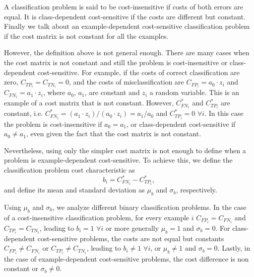   A classification problem is said to be cost-insensitive if costs of both errors are equal. It 
    is class-dependent cost-sensitive if the costs are different but constant. Finally we talk 
    about an example-dependent cost-sensitive classification problem if the cost matrix is not 
    constant for all the examples.
  
    However, the definition above is not general enough. There are many cases when the cost matrix 
    is not constant and still the problem is cost-insensitive or class-dependent cost-sensitive. 
    For example, if the costs of correct classification are zero, \mbox{$C_{TP_i}=C_{TN_i}=0$}, 
    and the costs of misclassification are $C_{FP_i}=a_0\cdot z_i$ and $C_{FN_i}=a_1\cdot z_i$,
    where $a_0$, $a_1$, are constant and $z_i$ a random variable. This is an example of a cost 
    matrix that is not constant. However, $C^*_{FN_i}$ and $C^*_{TP_i}$ are constant, i.e. 
    $C^*_{FN_i}=(a_1\cdot z_i)/(a_0\cdot z_i)=a_1/a_0$ and $C^*_{TP_i}=0$ $\forall i$. In 
    this case the problem is cost-insensitive if $a_0=a_1$, or class-dependent cost-sensitive if 
    $a_0 \ne a_1$, even given the fact that the cost matrix is not constant.
  
    Nevertheless, using only the simpler cost matrix is not enough to define when a problem is 
    example-dependent cost-sensitive. To achieve this, we define the classification problem cost 
    characteristic as 
    \begin{equation}
     b_i = C^*_{FN_i}-C^*_{TP_i},
    \end{equation}
    and define its mean and standard deviation as $\mu_b$ and $\sigma_b$, respectively.
  
    Using $\mu_b$ and $\sigma_b$, we analyze different binary classification problems. In the case 
    of a cost-insensitive classification problem, for every example $i$ \mbox{$C_{FP_i}=C_{FN_i}$}
    and $C_{TP_i}=C_{TN_i}$, leading to $b_i=1$ $\forall i$ or more generally $\mu_b=1$ and 
    $\sigma_b=0$. For class-dependent cost-sensitive problems, the costs are not equal but 
    constants \mbox{$C_{FP_i}\ne C_{FN_i}$} or \mbox{$C_{TP_i}\ne C_{TN_i}$}, leading to $b_i \ne 
    1$ $\forall i$, or $\mu_b \ne 1$ and $\sigma_b=0$. Lastly, in the case of example-dependent 
    cost-sensitive problems, the cost difference is non constant or $\sigma_b \ne 0$.
  
